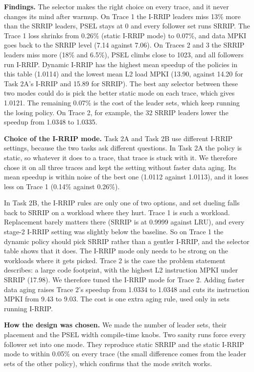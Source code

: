 \documentclass[10pt]{article}
\begin{document}
\medskip
\textbf{Findings.} The selector makes the right choice on every trace, and it never changes its mind after warmup. On Trace 1 the I-RRIP leaders miss 13\% more than the SRRIP leaders, PSEL stays at 0 and every follower set runs SRRIP. The Trace 1 loss shrinks from 0.26\% (static I-RRIP mode) to 0.07\%, and data MPKI goes back to the SRRIP level (7.14 against 7.06). On Traces 2 and 3 the SRRIP leaders miss more (18\% and 6.5\%), PSEL climbs close to 1023, and all followers run I-RRIP. Dynamic I-RRIP has the highest mean speedup of the policies in this table (1.0114) and the lowest mean L2 load MPKI (13.90, against 14.20 for Task 2A's I-RRIP and 15.89 for SRRIP). The best any selector between these two modes could do is pick the better static mode on each trace, which gives 1.0121. The remaining 0.07\% is the cost of the leader sets, which keep running the losing policy. On Trace 2, for example, the 32 SRRIP leaders lower the speedup from 1.0348 to 1.0335.

\textbf{Choice of the I-RRIP mode.} Task 2A and Task 2B use different I-RRIP settings, because the two tasks ask different questions. In Task 2A the policy is static, so whatever it does to a trace, that trace is stuck with it. We therefore chose it on all three traces and kept the setting without faster data aging. Its mean speedup is within noise of the best one (1.0112 against 1.0113), and it loses less on Trace 1 (0.14\% against 0.26\%).

In Task 2B, the I-RRIP rules are only one of two options, and set dueling falls back to SRRIP on a workload where they hurt. Trace 1 is such a workload. Replacement barely matters there (SRRIP is at 0.9999 against LRU), and every stage-2 I-RRIP setting was slightly below the baseline. So on Trace 1 the dynamic policy should pick SRRIP rather than a gentler I-RRIP, and the selector table shows that it does. The I-RRIP mode only needs to be strong on the workloads where it gets picked. Trace 2 is the case the problem statement describes: a large code footprint, with the highest L2 instruction MPKI under SRRIP (17.98). We therefore tuned the I-RRIP mode for Trace 2. Adding faster data aging raises Trace 2's speedup from 1.0334 to 1.0348 and cuts its instruction MPKI from 9.43 to 9.03. The cost is one extra aging rule, used only in sets running I-RRIP.

\textbf{How the design was chosen.} We made the number of leader sets, their placement and the PSEL width compile-time knobs. Two sanity runs force every follower set into one mode. They reproduce static SRRIP and the static I-RRIP mode to within 0.05\% on every trace (the small difference comes from the leader sets of the other policy), which confirms that the mode switch works.
\end{document}
